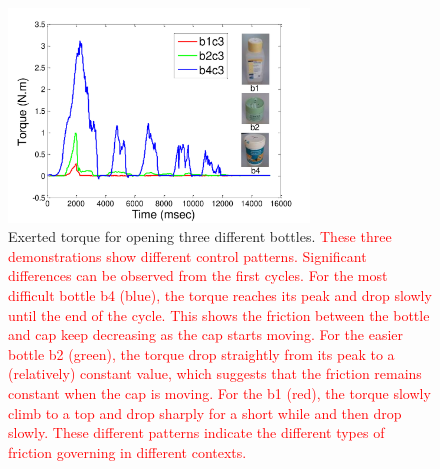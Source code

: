 \begin{figure}
  \centering
  \includegraphics[width=8cm]{./fig/b1b2b4_time_T.pdf}
  \caption{ \scriptsize{Exerted torque for opening three different bottles. \textcolor{red}{These three demonstrations show different control patterns. Significant differences can be observed from the first cycles. For the most difficult bottle b4 (blue), the torque reaches its peak and drop slowly until the end of the cycle. This shows the friction between the bottle and cap keep decreasing as the cap starts moving. For the easier bottle b2 (green), the torque drop straightly from its peak to a (relatively) constant value, which suggests that the friction remains constant when the cap is moving. For the b1 (red), the torque slowly climb to a top and drop sharply for a short while and then drop slowly. These different patterns indicate the different types of friction governing in different contexts.}}
}
\label{fig:bottlepatterns}
\end{figure}


